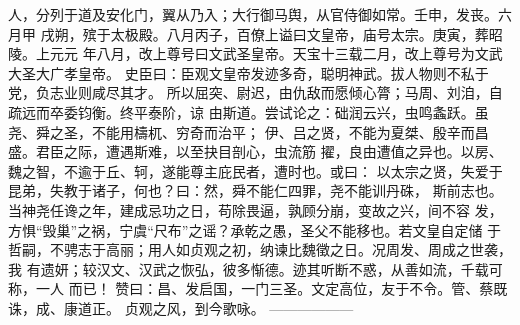 \documentclass[12pt,UTF8]{ctexbook}
\begin{document}
人，分列于道及安化门，翼从乃入；大行御马舆，从官侍御如常。壬申，发丧。六月甲
戌朔，殡于太极殿。八月丙子，百僚上谥曰文皇帝，庙号太宗。庚寅，葬昭陵。上元元
年八月，改上尊号曰文武圣皇帝。天宝十三载二月，改上尊号为文武大圣大广孝皇帝。
史臣曰：臣观文皇帝发迹多奇，聪明神武。拔人物则不私于党，负志业则咸尽其才。
所以屈突、尉迟，由仇敌而愿倾心膂；马周、刘洎，自疏远而卒委钧衡。终平泰阶，谅
由斯道。尝试论之：础润云兴，虫鸣螽跃。虽尧、舜之圣，不能用檮杌、穷奇而治平；
伊、吕之贤，不能为夏桀、殷辛而昌盛。君臣之际，遭遇斯难，以至抉目剖心，虫流筋
擢，良由遭值之异也。以房、魏之智，不逾于丘、轲，遂能尊主庇民者，遭时也。或曰：
以太宗之贤，失爱于昆弟，失教于诸子，何也？曰：然，舜不能仁四罪，尧不能训丹硃，
斯前志也。当神尧任谗之年，建成忌功之日，苟除畏逼，孰顾分崩，变故之兴，间不容
发，方惧“毁巢”之祸，宁虞“尺布”之谣？承乾之愚，圣父不能移也。若文皇自定储
于哲嗣，不骋志于高丽；用人如贞观之初，纳谏比魏徵之日。况周发、周成之世袭，我
有遗妍；较汉文、汉武之恢弘，彼多惭德。迹其听断不惑，从善如流，千载可称，一人
而已！
赞曰：昌、发启国，一门三圣。文定高位，友于不令。管、蔡既诛，成、康道正。
贞观之风，到今歌咏。
------------------
\end{document}
